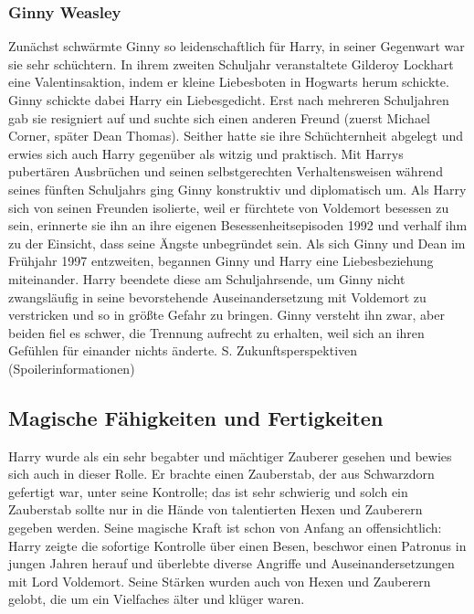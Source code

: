 \documentclass[a4paper, 10pt]{article}
\begin{document}
\subsubsection*{\large Ginny Weasley}
Zunächst schwärmte Ginny so leidenschaftlich für Harry, in seiner Gegenwart war sie sehr schüchtern. In ihrem zweiten Schuljahr veranstaltete Gilderoy Lockhart eine Valentinsaktion, indem er kleine Liebesboten in Hogwarts herum schickte. Ginny schickte dabei Harry ein Liebesgedicht. Erst nach mehreren Schuljahren gab sie resigniert auf und suchte sich einen anderen Freund (zuerst Michael Corner, später Dean Thomas). Seither hatte sie ihre Schüchternheit abgelegt und erwies sich auch Harry gegenüber als witzig und praktisch.
\vspace{10pt}
\newline
{}  
Mit Harrys pubertären Ausbrüchen und seinen selbstgerechten Verhaltensweisen während seines fünften Schuljahrs ging Ginny konstruktiv und diplomatisch um. Als Harry sich von seinen Freunden isolierte, weil er fürchtete von Voldemort besessen zu sein, erinnerte sie ihn an ihre eigenen Besessenheitsepisoden 1992 und verhalf ihm zu der Einsicht, dass seine Ängste unbegründet sein.
\vspace{10pt}
\newline
{}  
Als sich Ginny und Dean im Frühjahr 1997 entzweiten, begannen Ginny und Harry eine Liebesbeziehung miteinander. Harry beendete diese am Schuljahrsende, um Ginny nicht zwangsläufig in seine bevorstehende Auseinandersetzung mit Voldemort zu verstricken und so in größte Gefahr zu bringen. Ginny versteht ihn zwar, aber beiden fiel es schwer, die Trennung aufrecht zu erhalten, weil sich an ihren Gefühlen für einander nichts änderte. S. Zukunftsperspektiven (Spoilerinformationen)
\subsection*{\Large Magische Fähigkeiten und Fertigkeiten}
Harry wurde als ein sehr begabter und mächtiger Zauberer gesehen und bewies sich auch in dieser Rolle. Er brachte einen Zauberstab, der aus Schwarzdorn gefertigt war, unter seine Kontrolle; das ist sehr schwierig und solch ein Zauberstab sollte nur in die Hände von talentierten Hexen und Zauberern gegeben werden. Seine magische Kraft ist schon von Anfang an offensichtlich: Harry zeigte die sofortige Kontrolle über einen Besen, beschwor einen Patronus in jungen Jahren herauf und überlebte diverse Angriffe und Auseinandersetzungen mit Lord Voldemort. Seine Stärken wurden auch von Hexen und Zauberern gelobt, die um ein Vielfaches älter und klüger waren.
\end{document}
